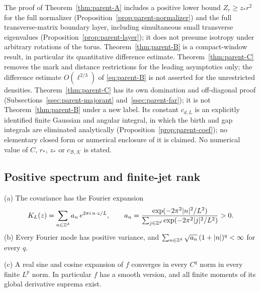 \begin{remark}\label{rem:parent-scopeABC}
The proof of Theorem~\ref{thm:parent-A} includes a positive lower bound $Z_r\ge z_*r^2$ for the full normalizer (Proposition~\ref{prop:parent-normalizer}) and the full transverse-matrix boundary layer, including simultaneous small transverse eigenvalues (Proposition~\ref{prop:parent-layer}); it does not presume isotropy under arbitrary rotations of the torus. Theorem~\ref{thm:parent-B} is a compact-window result, in particular its quantitative difference estimate. Theorem~\ref{thm:parent-C} removes the mark and distance restrictions for the leading asymptotics only; the difference estimate $O(\ell^{2/3})$ of \eqref{eq:parent-B} is not asserted for the unrestricted densities. Theorem~\ref{thm:parent-C} has its own domination and off-diagonal proof (Subsections~\ref{ssec:parent-majorant} and~\ref{ssec:parent-far}); it is not Theorem~\ref{thm:parent-B} under a new label. Its constant $c_{d,L}$ is an explicitly identified finite Gaussian and angular integral, in which the birth and gap integrals are eliminated analytically (Proposition~\ref{prop:parent-coef}); no elementary closed form or numerical enclosure of it is claimed. No numerical value of $C$, $r_*$, $z_*$ or $c_{\mathcal B,\mathcal K}$ is stated.
\end{remark}

\subsection{Positive spectrum and finite-jet rank}\label{ssec:parent-spectrum}

\begin{lemma}\label{lem:parent-spectrum}
\textup{(a)} The covariance has the Fourier expansion
\begin{equation}\label{eq:parent-an}
K_L(z)=\sum_{n\in\mathbb Z^d}a_n\,e^{2\pi i\,n\cdot z/L},\qquad a_n=\frac{\exp(-2\pi^2|n|^2/L^2)}{\sum_{j\in\mathbb Z^d}\exp(-2\pi^2|j|^2/L^2)}>0 .
\end{equation}
\textup{(b)} Every Fourier mode has positive variance, and $\sum_{n\in\mathbb Z^d}\sqrt{a_n}\,(1+|n|)^q<\infty$ for every $q$.

\textup{(c)} A real sine and cosine expansion of $f$ converges in every $C^q$ norm in every finite $L^p$ norm. In particular $f$ has a smooth version, and all finite moments of its global derivative suprema exist.
\end{lemma}

